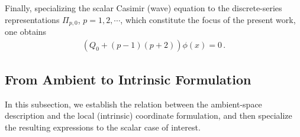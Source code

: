 \documentclass[aps,twocolumn,nofootinbib]{revtex4}
\begin{document}
Finally, specializing the scalar Casimir (wave) equation to the discrete-series representations $\Pi_{p,0}$, $p=1,2,\cdots$, which constitute the focus of the present work, one obtains
\begin{align}\label{wave.eq.111}
    \left( Q_0 + (p-1)(p+2) \right) \phi(x) = 0 \,.
\end{align}


\subsection{From Ambient to Intrinsic Formulation}\label{Sec. Link}

In this subsection, we establish the relation between the ambient-space description and the local (intrinsic) coordinate formulation, and then specialize the resulting expressions to the scalar case of interest.
\end{document}
